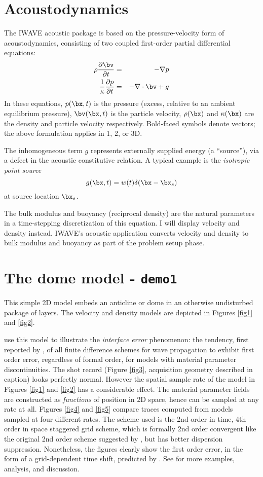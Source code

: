 \section{Acoustodynamics}
The IWAVE acoustic package is based on the pressure-velocity form of acoustodynamics, consisting of two coupled first-order partial differential equations:
\begin{eqnarray}
\label{awe}
\rho \frac{\partial \bv}{\partial t} &=& - \nabla p \\
\frac{1}{\kappa}\frac{\partial p}{\partial t} &=& -\nabla \cdot \bv + g
\end{eqnarray}
In these equations, $p(\bx,t)$ is the pressure (excess, relative to an ambient equilibrium pressure), $\bv(\bx,t)$ is the particle velocity, $\rho(\bx)$ and $\kappa(\bx)$ are the density and particle velocity respectively. Bold-faced symbols denote vectors; the above formulation applies in 1, 2, or 3D. 

The inhomogeneous term $g$ represents externally supplied energy (a
``source''), via a defect in the acoustic constitutive relation. A
typical example is the {\em isotropic point source}
\[
g(\bx,t) = w(t) \delta(\bx-\bx_s)
\]
at source location $\bx_s$.

The bulk modulus and buoyancy (reciprocal density) are the natural parameters in a time-stepping discretization of this equation. I will display velocity and density instead. IWAVE's acoustic application converts velocity and density to bulk modulus and buoyancy as part of the problem setup phase.

\section{The dome model - {\tt demo1}}

This simple 2D model embeds an anticline or dome in an otherwise
undisturbed package of layers. The velocity and density models are
depicted in Figures \ref{fig1} and \ref{fig2}.

\cite{SymesVdovina:09} use this model to illustrate the {\em
  interface error} phenomenon: the tendency, first reported by
\cite{Brown:84}, of all finite difference schemes for wave
propagation to exhibit first order error, regardless of formal order,
for models with material parameter discontinuities. The shot record
(Figure \ref{fig3}, acquisition geometry described in caption) looks
perfectly normal. However the spatial sample rate of the model in
Figures \ref{fig1} and \ref{fig2} has a considerable effect. The
material parameter fields are constructed as {\em functions} of
position in 2D space, hence can be sampled at any rate at all. Figures
\ref{fig4} and \ref{fig5} compare traces computed from models sampled
at four different rates. The scheme used is the 2nd order in time,
4th order in space staggered grid scheme, which is formally 2nd order
convergent like the original 2nd order scheme suggested by
\cite{Vir:84}, but has better dispersion suppression. Nonetheless,
the figures clearly show the first order error, in the form of a
grid-dependent time shift, predicted by \cite{Brown:84}. See
\cite[]{SymesVdovina:09} for more examples, analysis, and discussion.

